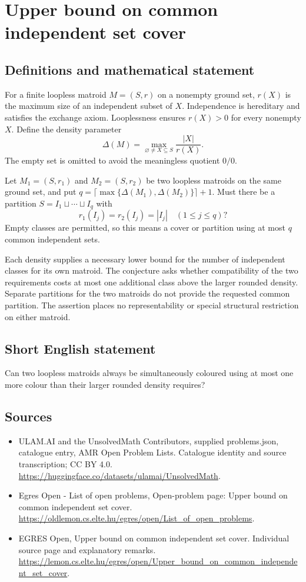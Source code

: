 \documentclass[11pt,a4paper]{article}
\begin{document}
\section*{Upper bound on common independent set cover}\label{statement}

\subsection{Definitions and mathematical statement}
For a finite loopless matroid $M=(S,r)$ on a nonempty ground set,
$r(X)$ is the maximum size of an independent subset of $X$.
Independence is hereditary and satisfies the exchange axiom.
Looplessness ensures $r(X)>0$ for every nonempty $X$.
Define the density parameter
\[
                              \Delta(M)=
                     \max_{\varnothing\ne X\subseteq S}\frac{|X|}{r(X)}.
\]
The empty set is omitted to avoid the meaningless quotient $0/0$.

Let $M_1=(S,r_1)$ and $M_2=(S,r_2)$ be two loopless matroids
on the same ground set, and put
$q=\lceil\max\{\Delta(M_1),\Delta(M_2)\}\rceil+1$.
Must there be a partition $S=I_1\sqcup\cdots\sqcup I_q$ with
\[
                             r_1(I_j)=r_2(I_j)=|I_j|
                                      \quad(1\le j\le q)?
\]
Empty classes are permitted, so this means a cover or partition
using at most $q$ common independent sets.

Each density supplies a necessary lower bound for the number
of independent classes for its own matroid. The conjecture asks
whether compatibility of the two requirements costs at most one
additional class above the larger rounded density. Separate
partitions for the two matroids do not provide the requested
common partition. The assertion places no representability or
special structural restriction on either matroid.
\subsection{Short English statement}
Can two loopless matroids always be simultaneously coloured
using at most one more colour than their larger rounded density requires?
\subsection{Sources}
\begin{itemize}
\item[S1] ULAM.AI and the UnsolvedMath Contributors, supplied problems.json, catalogue entry, AMR Open Problem Lists. Catalogue identity and source transcription; CC BY 4.0.
\url{https://huggingface.co/datasets/ulamai/UnsolvedMath}.
\item[S2] Egres Open - List of open problems, Open-problem page: Upper bound on common independent set cover. 
\url{https://oldlemon.cs.elte.hu/egres/open/List_of_open_problems}.
\item[S3] EGRES Open, Upper bound on common independent set cover. Individual source page and explanatory remarks.
\url{https://lemon.cs.elte.hu/egres/open/Upper_bound_on_common_independent_set_cover}.
\end{itemize}
\end{document}
